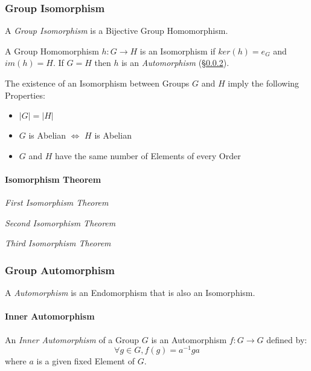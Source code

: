 \subsubsection{Group Isomorphism}\label{sec:group_isomorphism}

A \emph{Group Isomorphism} is a Bijective Group Homomorphism.

A Group Homomorphism $h : G \rightarrow H$ is an Isomorphism if
$ker(h) = e_G$ and $im(h) = H$. If $G = H$ then $h$ is an
\emph{Automorphism} (\S\ref{sec:group_automorphism}).

The existence of an Isomorphism between Groups $G$ and $H$ imply the
following Properties:
\begin{itemize}
    \item $|G| = |H|$
    \item $G$ is Abelian $\Leftrightarrow$ $H$ is Abelian
    \item $G$ and $H$ have the same number of Elements of every Order
\end{itemize}



\paragraph{Isomorphism Theorem}\label{sec:isomorphism_theorem}\hfill

\emph{First Isomorphism Theorem}

\emph{Second Isomorphism Theorem}

\emph{Third Isomorphism Theorem}



\subsubsection{Group Automorphism}\label{sec:group_automorphism}

A \emph{Automorphism} is an Endomorphism that is also an Isomorphism.



\paragraph{Inner Automorphism}\label{sec:inner_automorphism}\hfill

An \emph{Inner Automorphism} of a Group $G$ is an Automorphism $f : G
\rightarrow G$ defined by:
\[
    \forall g \in G, f(g) = a^{-1}ga
\]
where $a$ is a given fixed Element of $G$.




